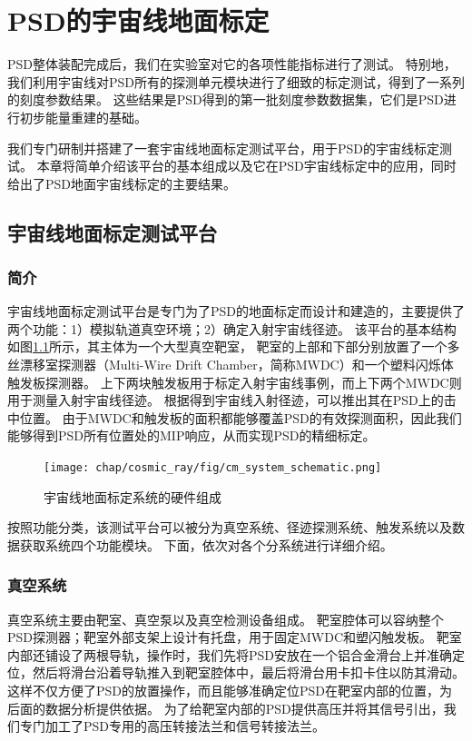\chapter{PSD的宇宙线地面标定}
\label{ch:cosmic_ray}
PSD整体装配完成后，我们在实验室对它的各项性能指标进行了测试。
特别地，我们利用宇宙线对PSD所有的探测单元模块进行了细致的标定测试，得到了一系列的刻度参数结果。
这些结果是PSD得到的第一批刻度参数数据集，它们是PSD进行初步能量重建的基础。

我们专门研制并搭建了一套宇宙线地面标定测试平台，用于PSD的宇宙线标定测试。
本章将简单介绍该平台的基本组成以及它在PSD宇宙线标定中的应用，同时给出了PSD地面宇宙线标定的主要结果。

\section{宇宙线地面标定测试平台}
\label{sec:cosmic_ray:cm_system}
\subsection{简介}
\label{sec:cosmic_ray:introduction}
宇宙线地面标定测试平台是专门为了PSD的地面标定而设计和建造的，主要提供了两个功能：1）模拟轨道真空环境；2）确定入射宇宙线径迹。
该平台的基本结构如图\ref{fig:cosmic_ray:cm_system}所示，其主体为一个大型真空靶室，
靶室的上部和下部分别放置了一个多丝漂移室探测器（Multi-Wire Drift Chamber，简称MWDC）和一个塑料闪烁体触发板探测器。
上下两块触发板用于标定入射宇宙线事例，而上下两个MWDC则用于测量入射宇宙线径迹。
根据得到宇宙线入射径迹，可以推出其在PSD上的击中位置。
由于MWDC和触发板的面积都能够覆盖PSD的有效探测面积，因此我们能够得到PSD所有位置处的MIP响应，从而实现PSD的精细标定。
\begin{figure}[htbp]
	\centering
	\texttt{[image: chap/cosmic\_ray/fig/cm\_system\_schematic.png]}
	\caption{宇宙线地面标定系统的硬件组成}
	\label{fig:cosmic_ray:cm_system}
\end{figure}

按照功能分类，该测试平台可以被分为真空系统、径迹探测系统、触发系统以及数据获取系统四个功能模块。
下面，依次对各个分系统进行详细介绍。

\subsection{真空系统}
\label{sec:cosmic_ray:vacuum_system}
真空系统主要由靶室、真空泵以及真空检测设备组成。
靶室腔体可以容纳整个PSD探测器；靶室外部支架上设计有托盘，用于固定MWDC和塑闪触发板。
靶室内部还铺设了两根导轨，操作时，我们先将PSD安放在一个铝合金滑台上并准确定位，然后将滑台沿着导轨推入到靶室腔体中，最后将滑台用卡扣卡住以防其滑动。这样不仅方便了PSD的放置操作，而且能够准确定位PSD在靶室内部的位置，为后面的数据分析提供依据。
为了给靶室内部的PSD提供高压并将其信号引出，我们专门加工了PSD专用的高压转接法兰和信号转接法兰。

